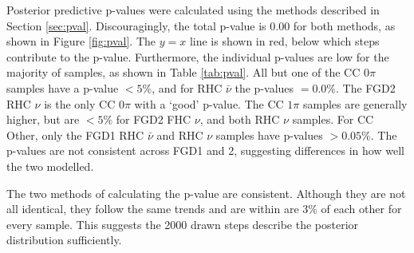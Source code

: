 Posterior predictive p-values were calculated using the methods described in Section \ref{sec:pval}. Discouragingly, the total p-value is 0.00 for both methods, as shown in Figure \ref{fig:pval}. The $y=x$ line is shown in red, below which steps contribute to the p-value. Furthermore, the individual p-values are low for the majority of samples, as shown in Table \ref{tab:pval}. All but one of the CC 0$\pi$ samples have a p-value $<5\%$, and for RHC $\bar{\nu}$ the p-values $=0.0\%$. The FGD2 RHC $\nu$ is the only CC 0$\pi$ with a `good' p-value. The CC $1\pi$ samples are generally higher, but are $<5\%$ for FGD2 FHC $\nu$, and both RHC $\nu$ samples. For CC Other, only the FGD1 RHC $\bar{\nu}$ and RHC $\nu$ samples have p-values $>0.05\%$. The p-values are not consistent across FGD1 and 2, suggesting differences in how well the two modelled.

The two methods of calculating the p-value are consistent. Although they are not all identical, they follow the same trends and are within are $3\%$ of each other for every sample. This suggests the 2000 drawn steps describe the posterior distribution sufficiently.


